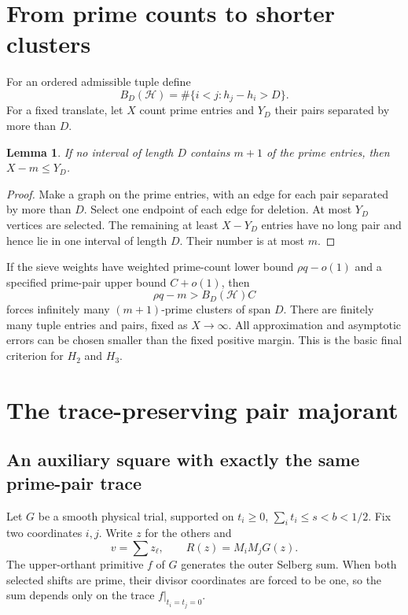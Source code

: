 \documentclass[11pt,a4paper]{article}
\newtheorem{lemma}[theorem]{Lemma}
\theoremstyle{definition}\newtheorem{definition}[theorem]{Definition}
\theoremstyle{remark}\newtheorem{remark}[theorem]{Remark}
\numberwithin{equation}{section}
\begin{document}
\section{From prime counts to shorter clusters}\label{sec:cluster}
For an ordered admissible tuple define
\[
 B_D(\mathcal H)=\#\{i<j:h_j-h_i>D\}.
\]
For a fixed translate, let $X$ count prime entries and $Y_D$ their pairs separated by more than $D$.

\begin{lemma}\label{lem:cluster}
If no interval of length $D$ contains $m+1$ of the prime entries, then $X-m\le Y_D$.
\end{lemma}
\begin{proof}
Make a graph on the prime entries, with an edge for each pair separated by more than $D$. Select one endpoint of each edge for deletion. At most $Y_D$ vertices are selected. The remaining at least $X-Y_D$ entries have no long pair and hence lie in one interval of length $D$. Their number is at most $m$.
\end{proof}

If the sieve weights have weighted prime-count lower bound $\rho q-o(1)$ and a specified prime-pair upper bound $C+o(1)$, then
\begin{equation}\label{eq:paircriterion}
 \rho q-m>B_D(\mathcal H)C
\end{equation}
forces infinitely many $(m+1)$-prime clusters of span $D$. There are finitely many tuple entries and pairs, fixed as $X\to\infty$. All approximation and asymptotic errors can be chosen smaller than the fixed positive margin. This is the basic final criterion for $H_2$ and $H_3$.

\section{The trace-preserving pair majorant}\label{sec:pair}
\subsection{An auxiliary square with exactly the same prime-pair trace}
Let $G$ be a smooth physical trial, supported on $t_i\ge0$, $\sum_i t_i\le s<b<1/2$. Fix two coordinates $i,j$. Write $z$ for the others and
\[
 v=\sum z_\ell,\qquad R(z)=M_iM_jG(z).
\]
The upper-orthant primitive $f$ of $G$ generates the outer Selberg sum. When both selected shifts are prime, their divisor coordinates are forced to be one, so the sum depends only on the trace $f|_{t_i=t_j=0}$.
\end{document}
